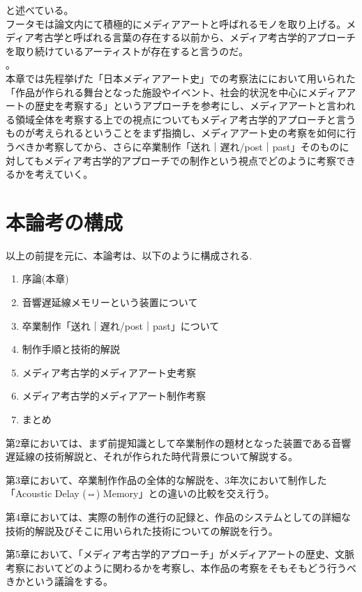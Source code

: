 \documentclass[a4paper,report]{jsbook}
\begin{document}
と述べている\autocite{ohta:mediaarch}。\\
フータモは論文内にて積極的にメディアアートと呼ばれるモノを取り上げる\autocite{huhtamo:mediaarcheology}。メディア考古学と呼ばれる言葉の存在する以前から、メディア考古学的アプローチを取り続けているアーティストが存在すると言うのだ。\\
。\\
本章では先程挙げた「日本メディアアート史」での考察法ににおいて用いられた「作品が作られる舞台となった施設やイベント、社会的状況を中心にメディアアートの歴史を考察する」というアプローチを参考にし、メディアアートと言われる領域全体を考察する上での視点についてもメディア考古学的アプローチと言うものが考えられるということをまず指摘し、メディアアート史の考察を如何に行うべきか考察してから、さらに卒業制作「送れ｜遅れ/post｜past」そのものに対してもメディア考古学的アプローチでの制作という視点でどのように考察できるかを考えていく。

\section{本論考の構成}\label{ux672cux8ad6ux8003ux306eux69cbux6210}

以上の前提を元に、本論考は、以下のように構成される.

\begin{enumerate}
\def\labelenumi{\arabic{enumi}.}
\tightlist
\item
  序論(本章)
\item
  音響遅延線メモリーという装置について
\item
  卒業制作「送れ｜遅れ/post｜past」について
\item
  制作手順と技術的解説
\item
  メディア考古学的メディアアート史考察
\item
  メディア考古学的メディアアート制作考察
\item
  まとめ
\end{enumerate}

第2章においては、まず前提知識として卒業制作の題材となった装置である音響遅延線の技術解説と、それが作られた時代背景について解説する。

第3章において、卒業制作作品の全体的な解説を、3年次において制作した「Acoustic
Delay (⇔) Memory」との違いの比較を交え行う。

第4章においては、実際の制作の進行の記録と、作品のシステムとしての詳細な技術的解説及びそこに用いられた技術についての解説を行う。

第5章において、「メディア考古学的アプローチ」がメディアアートの歴史、文脈考察においてどのように関わるかを考察し、本作品の考察をそもそもどう行うべきかという議論をする。
\end{document}
